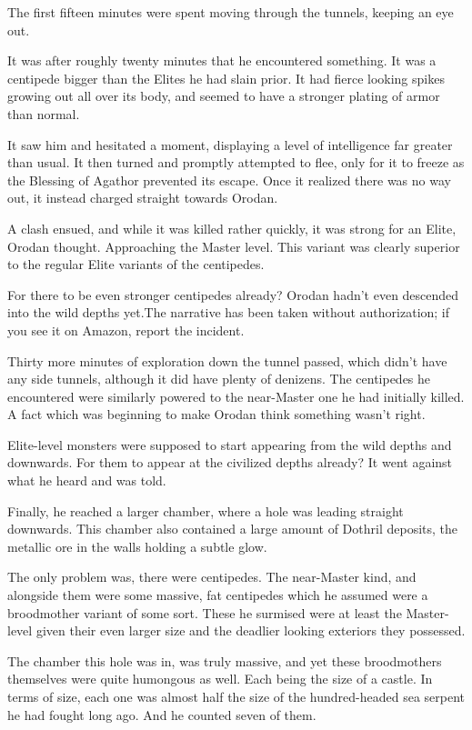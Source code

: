 \documentclass[a4paper,10pt]{book}
\begin{document}
The first fifteen minutes were spent moving through the tunnels, keeping an eye out.\par
It was after roughly twenty minutes that he encountered something. It was a centipede bigger than the Elites he had slain prior. It had fierce looking spikes growing out all over its body, and seemed to have a stronger plating of armor than normal.\par
It saw him and hesitated a moment, displaying a level of intelligence far greater than usual. It then turned and promptly attempted to flee, only for it to freeze as the Blessing of Agathor prevented its escape. Once it realized there was no way out, it instead charged straight towards Orodan.\par
A clash ensued, and while it was killed rather quickly, it was strong for an Elite, Orodan thought. Approaching the Master level. This variant was clearly superior to the regular Elite variants of the centipedes.\par
For there to be even stronger centipedes already? Orodan hadn’t even descended into the wild depths yet.The narrative has been taken without authorization; if you see it on Amazon, report the incident.\par
Thirty more minutes of exploration down the tunnel passed, which didn’t have any side tunnels, although it did have plenty of denizens. The centipedes he encountered were similarly powered to the near-Master one he had initially killed. A fact which was beginning to make Orodan think something wasn’t right.\par
Elite-level monsters were supposed to start appearing from the wild depths and downwards. For them to appear at the civilized depths already? It went against what he heard and was told.\par
Finally, he reached a larger chamber, where a hole was leading straight downwards. This chamber also contained a large amount of Dothril deposits, the metallic ore in the walls holding a subtle glow.\par
The only problem was, there were centipedes. The near-Master kind, and alongside them were some massive, fat centipedes which he assumed were a broodmother variant of some sort. These he surmised were at least the Master-level given their even larger size and the deadlier looking exteriors they possessed.\par
The chamber this hole was in, was truly massive, and yet these broodmothers themselves were quite humongous as well. Each being the size of a castle. In terms of size, each one was almost half the size of the hundred-headed sea serpent he had fought long ago. And he counted seven of them.\par
\end{document}
